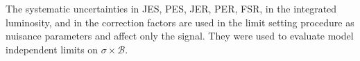 The systematic uncertainties in JES, PES, JER, PER, FSR, in the integrated luminosity, and in the correction factors are used in the limit 
setting procedure as nuisance parameters and affect only the signal. They were used to evaluate model independent limits on $\sigma\times\mathcal{B}$.
%
%
%

